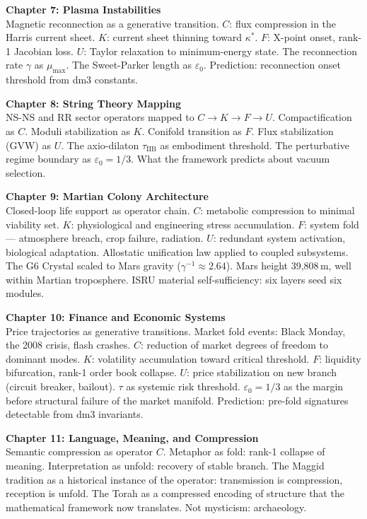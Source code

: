 \documentclass[12pt, oneside]{book}
\begin{document}
\medskip
\noindent\textbf{Chapter 7: Plasma Instabilities}\\
Magnetic reconnection as a generative transition.
$C$: flux compression in the Harris current sheet.
$K$: current sheet thinning toward $\kappa^*$.
$F$: X-point onset, rank-1 Jacobian loss.
$U$: Taylor relaxation to minimum-energy state.
The reconnection rate $\gamma$ as $\mu_{\max}$.
The Sweet-Parker length as $\varepsilon_0$.
Prediction: reconnection onset threshold from dm3 constants.

\medskip
\noindent\textbf{Chapter 8: String Theory Mapping}\\
NS-NS and RR sector operators mapped to $C \to K \to F \to U$.
Compactification as $C$. Moduli stabilization as $K$.
Conifold transition as $F$. Flux stabilization (GVW) as $U$.
The axio-dilaton $\tau_\text{IIB}$ as embodiment threshold.
The perturbative regime boundary as $\varepsilon_0 = 1/3$.
What the framework predicts about vacuum selection.

\medskip
\noindent\textbf{Chapter 9: Martian Colony Architecture}\\
Closed-loop life support as operator chain.
$C$: metabolic compression to minimal viability set.
$K$: physiological and engineering stress accumulation.
$F$: system fold --- atmosphere breach, crop failure, radiation.
$U$: redundant system activation, biological adaptation.
Allostatic unification law applied to coupled subsystems.
The G6 Crystal scaled to Mars gravity ($\gamma^{-1} \approx 2.64$).
Mars height 39,808\,m, well within Martian troposphere.
ISRU material self-sufficiency: six layers seed six modules.

\medskip
\noindent\textbf{Chapter 10: Finance and Economic Systems}\\
Price trajectories as generative transitions.
Market fold events: Black Monday, the 2008 crisis, flash crashes.
$C$: reduction of market degrees of freedom to dominant modes.
$K$: volatility accumulation toward critical threshold.
$F$: liquidity bifurcation, rank-1 order book collapse.
$U$: price stabilization on new branch (circuit breaker, bailout).
$\tau$ as systemic risk threshold. $\varepsilon_0 = 1/3$ as
the margin before structural failure of the market manifold.
Prediction: pre-fold signatures detectable from dm3 invariants.

\medskip
\noindent\textbf{Chapter 11: Language, Meaning, and Compression}\\
Semantic compression as operator $C$.
Metaphor as fold: rank-1 collapse of meaning.
Interpretation as unfold: recovery of stable branch.
The Maggid tradition as a historical instance of the operator:
transmission is compression, reception is unfold.
The Torah as a compressed encoding of structure that the
mathematical framework now translates.
Not mysticism: archaeology.
\end{document}
